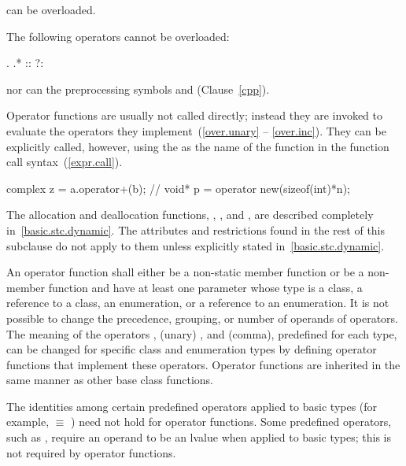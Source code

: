 can be overloaded.

\pnum
{}%
The following operators cannot be overloaded:

\begin{codeblock}
.    .*   ::    ?:
\end{codeblock}

nor can the preprocessing symbols
\tcode{\#}
and
\tcode{\#\#}
(Clause~\ref{cpp}).

\pnum
{}%
Operator functions are usually not called directly; instead they are invoked
to evaluate the operators they implement~(\ref{over.unary} -- \ref{over.inc}).
They can be explicitly called, however, using the
as the name of the function in the function call syntax~(\ref{expr.call}).
\enterexample

\begin{codeblock}
complex z = a.operator+(b);     // 
void* p = operator new(sizeof(int)*n);
\end{codeblock}
\exitexample

\pnum
The allocation and deallocation functions,
,
,
and
,
are described completely in~\ref{basic.stc.dynamic}.
The attributes and restrictions
found in the rest of this subclause do not apply to them unless explicitly
stated in~\ref{basic.stc.dynamic}.

\pnum
{}%
An operator function
shall either be a non-static member function or be a non-member function and
have at least one parameter whose type is a class, a reference to a class, an
enumeration, or a reference to an enumeration.
It is not possible to change the precedence, grouping, or number of operands
of operators.
The meaning of the operators
\tcode{=},
(unary)
\tcode{\&},
and
\tcode{,}
(comma), predefined for each type, can be changed for specific
class and enumeration types by
defining operator functions that implement these operators.
%
Operator functions are inherited in the same manner as other base class
functions.

\pnum
{}%
The identities among certain predefined operators applied to basic types
(for example,
 $\equiv$
)
need not hold for operator functions.
Some predefined operators, such as
\tcode{+=},
require an operand to be an lvalue when applied to basic types;
this is not required by operator functions.

